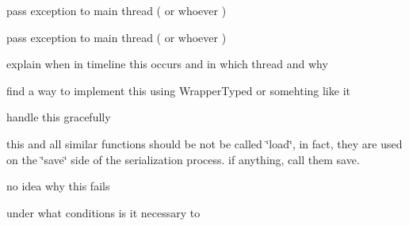 
\begin{DoxyRefList}
\item[\label{todo__todo000010}%
\hypertarget{todo__todo000010}{}%
\-Member \hyperlink{classgal_1_1network_1_1communicating_abd5efaa6563dda2097f69ae3679f87a1}{gal\-:\-:network\-:\-:communicating\-:\-:thread\-\_\-read} ()]pass exception to main thread ( or whoever )  
\item[\label{todo__todo000009}%
\hypertarget{todo__todo000009}{}%
\-Member \hyperlink{classgal_1_1network_1_1communicating_a271caa9e5d4d13fffda9d38218231b2c}{gal\-:\-:network\-:\-:communicating\-:\-:thread\-\_\-write} (boost\-::shared\-\_\-ptr$<$ message $>$)]pass exception to main thread ( or whoever )  
\item[\label{todo__todo000003}%
\hypertarget{todo__todo000003}{}%
\-Member \hyperlink{classglutpp_1_1Camera_1_1Projection_1_1Base_ac42d1a82122668c3958c586eea0d88d3}{glutpp\-:\-:\-Camera\-:\-:\-Projection\-:\-:\-Base\-:\-:step} (double)]explain when in timeline this occurs and in which thread and why  
\item[\label{todo__todo000007}%
\hypertarget{todo__todo000007}{}%
\-Class \hyperlink{structglutpp_1_1network_1_1actor_1_1update_1_1addr__raw}{glutpp\-:\-:network\-:\-:actor\-:\-:update\-:\-:addr\-\_\-raw} ]find a way to implement this using \-Wrapper\-Typed or somehting like it  
\item[\label{todo__todo000008}%
\hypertarget{todo__todo000008}{}%
\-Member \hyperlink{structglutpp_1_1network_1_1actor_1_1update_1_1addr__raw_a4883db7c0b5227e0fcb124f786a121c1}{glutpp\-:\-:network\-:\-:actor\-:\-:update\-:\-:addr\-\_\-raw\-:\-:load} (\-Archive \&ar, unsigned int const \&version)]handle this gracefully  
\item[\label{todo__todo000006}%
\hypertarget{todo__todo000006}{}%
\-Member \hyperlink{structglutpp_1_1network_1_1actor_1_1update_a2a7bee8209aa582266f5bb4e6e729501}{glutpp\-:\-:network\-:\-:actor\-:\-:update\-:\-:load} (\-Neb\-::weak\-\_\-ptr$<$ glutpp\-::actor\-::actor $>$ const \&actor)]this and all similar functions should be not be called \char`\"{}load\char`\"{}, in fact, they are used on the \char`\"{}save\char`\"{} side of the serialization process. if anything, call them save.  
\item[\label{todo__todo000012}%
\hypertarget{todo__todo000012}{}%
\-Member \hyperlink{classglutpp_1_1scene_1_1desc_a90063754f769b68b932ee7a54c252d69}{glutpp\-:\-:scene\-:\-:desc\-:\-:serialize} (\-Archive \&ar, unsigned int const \&version)]no idea why this fails  
\item[\label{todo__todo000005}%
\hypertarget{todo__todo000005}{}%
\-Namespace \hyperlink{namespaceNeb}{\-Neb} ]under what conditions is it necessary to 


\end{DoxyRefList}
